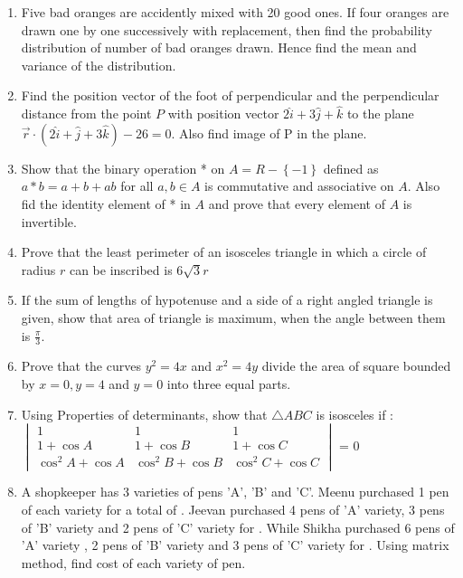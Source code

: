\documentclass[journal,12pt,onecolumn]{IEEEtran}
\theoremstyle{remark}
\providecommand{\brak}[1]{\ensuremath{\left(#1\right)}}
\providecommand{\cbrak}[1]{\ensuremath{\left\{#1\right\}}}
\newcommand{\mydet}[1]{\ensuremath{\begin{vmatrix}#1\end{vmatrix}}}
\begin{document}
\begin{enumerate}
    \item Five bad oranges are accidently mixed with 20 good ones. If four oranges are drawn one by one successively with replacement, then find the probability distribution of number of bad oranges drawn. Hence find the mean and variance of the distribution.
    \item Find the position vector of the foot of perpendicular and the perpendicular distance from the point $P$ with position vector $2\hat{i}+3\hat{j}+\hat{k}$ to the plane $\vec{r}\cdot\brak{2\hat{i}+\hat{j}+3\hat{k}} - 26=0$. Also find image of P in the plane.
    \item Show that the binary operation * on $ A=R -\cbrak{-1}$ defined as $a*b= a+b+ab$ for all $a,b \in A$ is commutative and associative on $A$. Also fid the identity element of * in $A$ and prove that every element of $A$ is invertible.
    \item Prove that the least perimeter of an isosceles triangle in which a circle of radius $r$ can be inscribed is $6 \sqrt{3} r$
    \item If the sum of lengths of hypotenuse and a side of a right angled triangle is given, show that area of triangle is maximum, when the angle between them is $\frac{\pi}{3}$.
    \item Prove that the curves $y^2=4x$ and $x^2= 4y$ divide the area of square bounded by $x=0,y=4$ and $y=0$ into three equal parts.
    \item Using Properties of determinants, show that $\triangle ABC$ is isosceles if :\\
          \mydet{
              1&1&1\\
              1+\cos A & 1+ \cos B & 1+ \cos C\\
              \cos^2 A + \cos A & \cos^2 B + \cos B & \cos^2 C + \cos C
          } = 0
    \item A shopkeeper has 3 varieties of pens 'A', 'B' and 'C'. Meenu purchased 1 pen of each variety for a total of . Jeevan purchased 4 pens of 'A' variety, 3 pens of 'B' variety and 2 pens of 'C' variety for . While Shikha purchased 6 pens of 'A' variety , 2 pens of 'B' variety and 3 pens of 'C' variety for . Using matrix method, find cost of each variety of pen.
\end{enumerate}
\end{document}
